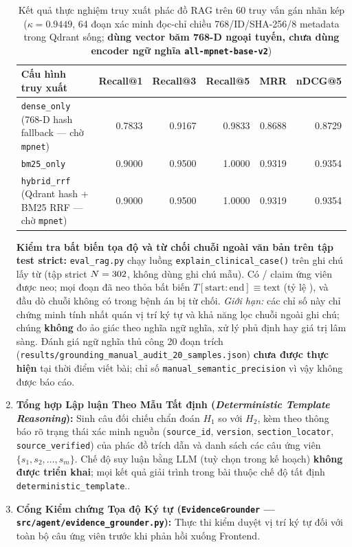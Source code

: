 \begin{enumerate}[leftmargin=1.8em, itemsep=0.2em]
\begin{table}[htbp]
\centering
\caption{Kết quả thực nghiệm truy xuất phác đồ RAG trên 60 truy vấn gán nhãn kép ($\kappa = 0.9449$, 64 đoạn xác minh đọc-chỉ chiều 768/ID/SHA-256/8 metadata trong Qdrant sống; \textbf{dùng vector băm 768-D ngoại tuyến, chưa dùng encoder ngữ nghĩa \texttt{all-mpnet-base-v2}})}
\label{tab:rag_eval}
\begin{tabularx}{\linewidth}{@{}lrrrrr@{}}
\toprule
\textbf{Cấu hình truy xuất} & \textbf{Recall@1} & \textbf{Recall@3} & \textbf{Recall@5} & \textbf{MRR} & \textbf{nDCG@5} \\
\midrule
\texttt{dense\_only} (768-D hash fallback --- chờ \texttt{mpnet}) & 0.7833 & 0.9167 & 0.9833 & 0.8688 & 0.8729 \\
\texttt{bm25\_only} & 0.9000 & 0.9500 & 1.0000 & 0.9319 & 0.9354 \\
\texttt{hybrid\_rrf} (Qdrant hash + BM25 RRF --- chờ \texttt{mpnet}) & 0.9000 & 0.9500 & 1.0000 & 0.9319 & 0.9354 \\
\bottomrule
\end{tabularx}
\end{table}

\textbf{Kiểm tra bất biến tọa độ và từ chối chuỗi ngoài văn bản trên tập test strict:} \texttt{eval\_rag.py} chạy luồng \texttt{explain\_clinical\_case()} trên \ragCases{} ghi chú lấy từ \texttt{\ragNotesSource} (tập strict $N=\testN$, không dùng ghi chú mẫu). Có \ragGrounded/\ragClaims{} claim ứng viên được neo; mọi đoạn đã neo thỏa bất biến $T[\text{start}:\text{end}] \equiv \text{text}$ (tỷ lệ \ragSpanMatch), và \ragProbes{} đầu dò chuỗi không có trong bệnh án bị từ chối. \textit{Giới hạn:} các chỉ số này chỉ chứng minh tính nhất quán vị trí ký tự và khả năng lọc chuỗi ngoài ghi chú; chúng \textbf{không} đo ảo giác theo nghĩa ngữ nghĩa, xử lý phủ định hay giá trị lâm sàng. Đánh giá ngữ nghĩa thủ công 20 đoạn trích (\texttt{results/grounding\_manual\_audit\_20\_samples.json}) \textbf{chưa được thực hiện} tại thời điểm viết bài; chỉ số \texttt{manual\_semantic\_precision} vì vậy không được báo cáo.
\item \textbf{Tổng hợp Lập luận Theo Mẫu Tất định (\textit{Deterministic Template Reasoning}):} Sinh câu đối chiếu chẩn đoán $H_1$ so với $H_2$, kèm theo thông báo rõ trạng thái xác minh nguồn (\texttt{source\_id}, \texttt{version}, \texttt{section\_locator}, \texttt{source\_verified}) của phác đồ trích dẫn và danh sách các câu ứng viên $\{s_1, s_2, \dots, s_m\}$. Chế độ suy luận bằng LLM (tuỳ chọn trong kế hoạch) \textbf{không được triển khai}; mọi kết quả giải trình trong bài thuộc chế độ tất định \texttt{deterministic\_template}..
    \item \textbf{Cổng Kiểm chứng Tọa độ Ký tự (\texttt{EvidenceGrounder} --- \texttt{src/agent/evidence\_grounder.py}):} Thực thi kiểm duyệt vị trí ký tự đối với toàn bộ câu ứng viên trước khi phản hồi xuống Frontend.
\end{enumerate}

